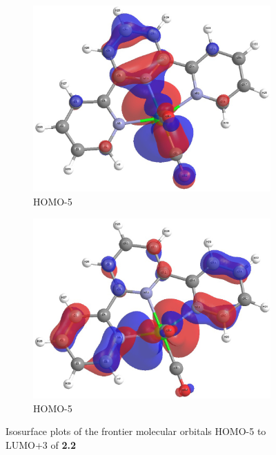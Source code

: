 \begin{figure}[!ht]
\begin{subfigure}[b]{0.31\textwidth}
  \includegraphics[clip=true, width=\textwidth, keepaspectratio]{images/mos/2h-4.eps}
  \caption{HOMO-5}
 \end{subfigure}
 \begin{subfigure}[b]{0.31\textwidth}
  \includegraphics[clip=true, width=\textwidth, keepaspectratio]{images/mos/2h-5.eps}
  \caption{HOMO-5}
 \end{subfigure}
\caption[Molecular orbitals HOMO-5 to LUMO+3 of \textbf{2.2}]{Isosurface plots of the frontier molecular orbitals HOMO-5 to LUMO+3 of \textbf{2.2}}
\label{fig.mo22}
\end{figure} 


